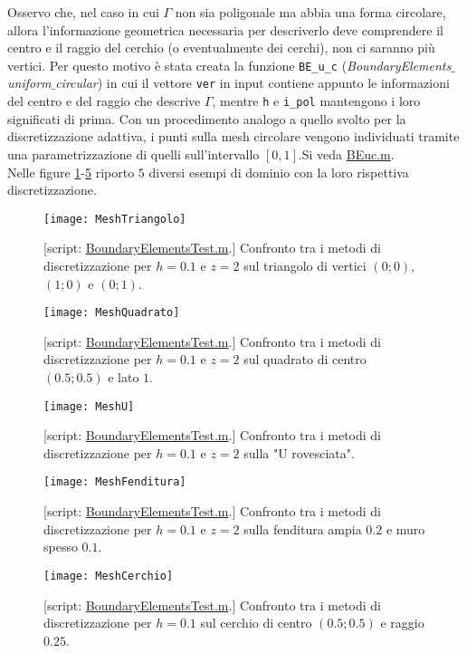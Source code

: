 Osservo che, nel caso in cui $\Gamma$ non sia poligonale ma abbia una forma circolare, allora l'informazione geometrica necessaria per descriverlo deve comprendere il centro e il raggio del cerchio (o eventualmente dei cerchi), non ci saranno più vertici. Per questo motivo è stata creata la funzione \verb|BE_u_c| (\textit{BoundaryElements$\_$uniform$\_$circular}) in cui il vettore \verb|ver| in input contiene appunto le informazioni del centro e del raggio che descrive $\Gamma$, mentre \verb|h| e \verb|i_pol| mantengono i loro significati di prima. Con un procedimento analogo a quello svolto per la discretizzazione adattiva, i punti sulla mesh circolare vengono individuati tramite una parametrizzazione di quelli sull'intervallo $[0,1]$.Si veda \href{https://github.com/Daldossi/BEM/blob/main/BE_u_c.m}{BEuc.m}. \\
Nelle figure \ref{MeshT}-\ref{MeshC} riporto $5$ diversi esempi di dominio con la loro rispettiva discretizzazione.
\begin{figure}
	\centering
	\texttt{[image: MeshTriangolo]}
	\caption{[script: \href{https://github.com/Daldossi/BEM/blob/main/BoundaryElements_test.m}{BoundaryElementsTest.m}.] Confronto tra i metodi di discretizzazione per $h= 0.1$ e $z= 2$ sul triangolo di vertici $(0;0)$, $(1;0)$ e $(0;1)$.}
	\label{MeshT}
\end{figure}
\begin{figure}
	\centering
	\texttt{[image: MeshQuadrato]}
	\caption{[script: \href{https://github.com/Daldossi/BEM/blob/main/BoundaryElements_test.m}{BoundaryElementsTest.m}.] Confronto tra i metodi di discretizzazione per $h= 0.1$ e $z= 2$ sul quadrato di centro $(0.5;0.5)$ e lato $1$.}
	\label{MeshQ}
\end{figure}
\begin{figure}
	\centering
	\texttt{[image: MeshU]}
	\caption{[script: \href{https://github.com/Daldossi/BEM/blob/main/BoundaryElements_test.m}{BoundaryElementsTest.m}.] Confronto tra i metodi di discretizzazione per $h= 0.1$ e $z= 2$ sulla "U rovesciata".}
	\label{MeshU}
\end{figure}
\begin{figure}
	\centering
	\texttt{[image: MeshFenditura]}
	\caption{[script: \href{https://github.com/Daldossi/BEM/blob/main/BoundaryElements_test.m}{BoundaryElementsTest.m}.] Confronto tra i metodi di discretizzazione per $h= 0.1$ e $z= 2$ sulla fenditura ampia $0.2$ e muro spesso $0.1$.}
	\label{MeshF}
\end{figure}
\begin{figure}
	\centering
	\texttt{[image: MeshCerchio]}
	\caption{[script: \href{https://github.com/Daldossi/BEM/blob/main/BoundaryElements_test.m}{BoundaryElementsTest.m}.] Confronto tra i metodi di discretizzazione per $h= 0.1$ sul cerchio di centro $(0.5;0.5)$ e raggio $0.25$.}
	\label{MeshC}
\end{figure}



